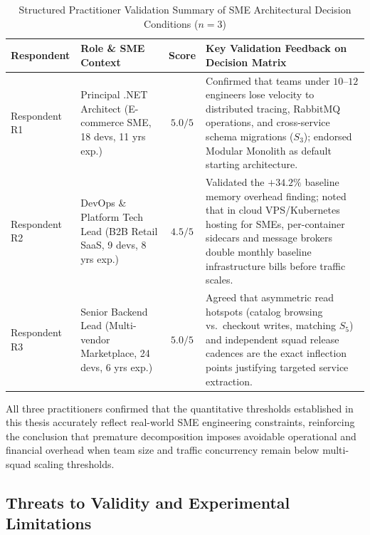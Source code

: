 \begin{table}[htbp]
\centering
\caption{Structured Practitioner Validation Summary of SME Architectural Decision Conditions ($n = 3$)}
\label{tab:practitioner_validation}
\small
\begin{tabular}{p{1.8cm} p{3.4cm} c p{6.2cm}}
\toprule
\textbf{Respondent} & \textbf{Role \& SME Context} & \textbf{Score} & \textbf{Key Validation Feedback on Decision Matrix} \\
\midrule
Respondent R1 & Principal .NET Architect (E-commerce SME, 18 devs, 11 yrs exp.) & $5.0 / 5$ & Confirmed that teams under $10$--$12$ engineers lose velocity to distributed tracing, RabbitMQ operations, and cross-service schema migrations ($S_3$); endorsed Modular Monolith as default starting architecture. \\
\addlinespace
Respondent R2 & DevOps \& Platform Tech Lead (B2B Retail SaaS, 9 devs, 8 yrs exp.) & $4.5 / 5$ & Validated the $+34.2\%$ baseline memory overhead finding; noted that in cloud VPS/Kubernetes hosting for SMEs, per-container sidecars and message brokers double monthly baseline infrastructure bills before traffic scales. \\
\addlinespace
Respondent R3 & Senior Backend Lead (Multi-vendor Marketplace, 24 devs, 6 yrs exp.) & $5.0 / 5$ & Agreed that asymmetric read hotspots (catalog browsing vs.\ checkout writes, matching $S_5$) and independent squad release cadences are the exact inflection points justifying targeted service extraction. \\
\bottomrule
\end{tabular}
\end{table}

All three practitioners confirmed that the quantitative thresholds established in this thesis accurately reflect real-world SME engineering constraints, reinforcing the conclusion that premature decomposition imposes avoidable operational and financial overhead when team size and traffic concurrency remain below multi-squad scaling thresholds.

\subsection{Threats to Validity and Experimental Limitations}

